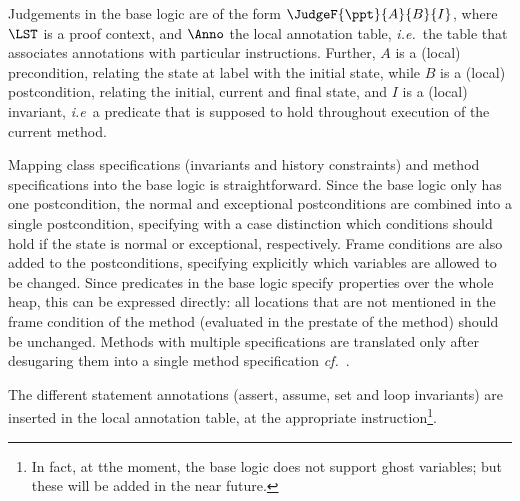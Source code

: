 Judgements in the \mobius base logic are of the form
\(\JudgeF{\ppt}{A}{B}{I}\), where \(\LST\) is a proof context,
and \(\Anno\) the local annotation table, \emph{i.e.}~the table that
associates annotations with particular instructions. Further, \(A\) is
a (local) precondition, relating the state at label \ppt with the
initial state, while \(B\) is a (local) postcondition, relating the
initial, current and final state, and \(I\) is a (local) invariant,
\emph{i.e}\ a predicate that is supposed to hold throughout execution
of the current method.

Mapping class specifications (invariants and history constraints) and
method specifications into the \mobius base logic is straightforward.
Since the \mobius base logic only has one postcondition, the normal
and exceptional postconditions are combined into a single
postcondition, specifying with a case distinction which conditions
should hold if the state is normal or exceptional, respectively. Frame
conditions are also added to the postconditions, specifying
explicitly which variables are allowed to be changed. Since predicates
in the \mobius base logic specify properties over the whole heap, this
can be expressed directly: all locations that are not mentioned in the
frame condition of the method (evaluated in the prestate of the
method) should be unchanged. Methods with multiple specifications are
translated only after desugaring them into a single method
specification \emph{cf.}~\cite{RaghavanL00}. 

The different statement annotations (assert, assume, set and loop
invariants) are inserted in the local annotation table, at the
appropriate instruction\footnote{In fact, at tthe moment, the \mobius
base logic does not support ghost variables; but these will be added
in the near future.}. 

